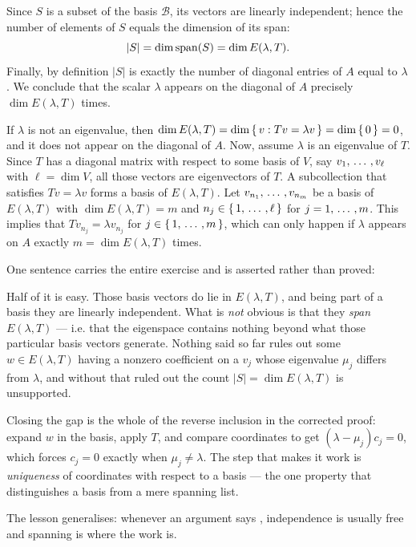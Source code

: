 \begin{xrcs}
\begin{xprf}
    Since $S$ is a subset of the basis $\mathcal{B}$, its vectors are linearly independent; hence the number of elements of $S$ equals the dimension of its span:
    \begin{equation}
      |S| = \dim \operatorname{span} (S) = \dim E(\lambda, T).
    \end{equation}
    Finally, by definition $|S|$ is exactly the number of diagonal entries of $A$ equal to $\lambda$. We conclude that the scalar $\lambda$ appears on the diagonal of $A$ precisely $\dim E(\lambda, T)$ times.
  \end{xprf}

  \begin{failedattempt}
    If $\lambda$ is not an eigenvalue, then $\dim E(\lambda, T) = \dim \left\{ \,  v : Tv = \lambda v  \,\right\} = \dim \left\{ \, 0 \,\right\} = 0$, and it does not appear on the diagonal of $A$.
    Now, assume $\lambda$ is an eigenvalue of $T$. Since $T$ has a diagonal matrix with respect to some basis of $V$, say $v_1, {\, \ldots \,\,}, v_\ell$ with $\ell = \dim V$,
    all those vectors are eigenvectors of $T$. A subcollection that satisfies $Tv = \lambda v$ forms a basis of $E(\lambda, T)$.
    Let $v_{n_1}, {\, \ldots \,\,}, v_{n_m}$ be a basis of $E(\lambda, T)$ with $\dim E(\lambda, T) = m$ and $n_j \in \left\{ \, 1, {\, \ldots \,\,}, \ell \,\right\}$ for $j = 1, {\, \ldots \,\,}, m$.
    This implies that $T v_{n_j} = \lambda v_{n_j}$ for $j \in \left\{ \, 1, {\, \ldots \,\,}, m  \,\right\}$, which can only happen if $\lambda$ appears on $A$ exactly $m = \dim E(\lambda, T)$ times.
  \end{failedattempt}

  \begin{ainote}
    One sentence carries the entire exercise and is asserted rather than proved: 

    Half of it is easy. Those basis vectors do lie in $E(\lambda, T)$, and being part of a basis they are linearly independent. What is \emph{not} obvious is that they \emph{span} $E(\lambda, T)$ --- i.e. that the eigenspace contains nothing beyond what those particular basis vectors generate. Nothing said so far rules out some $w \in E(\lambda,T)$ having a nonzero coefficient on a $v_j$ whose eigenvalue $\mu_j$ differs from $\lambda$, and without that ruled out the count $|S| = \dim E(\lambda,T)$ is unsupported.

    Closing the gap is the whole of the reverse inclusion in the corrected proof: expand $w$ in the basis, apply $T$, and compare coordinates to get $(\lambda - \mu_j)c_j = 0$, which forces $c_j = 0$ exactly when $\mu_j \neq \lambda$. The step that makes it work is \emph{uniqueness} of coordinates with respect to a basis --- the one property that distinguishes a basis from a mere spanning list.

    The lesson generalises: whenever an argument says , independence is usually free and spanning is where the work is.
  \end{ainote}
\end{xrcs}

